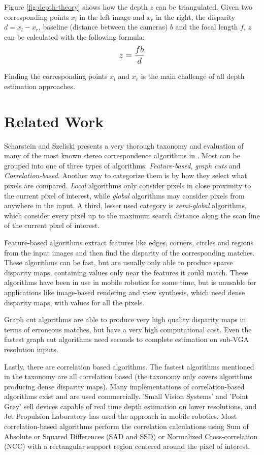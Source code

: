 Figure \ref{fig:depth-theory} shows how the depth $z$ can be
triangulated. Given two corresponding points $x_l$ in the left image
and $x_r$ in the right, the disparity $d = x_l - x_r$, baseline
(distance between the cameras) $b$ and the focal length $f$, $z$ can
be calculated with the following formula:
\[
  \mathlarger{z = \frac{fb}{d}}
\]

Finding the corresponding points $x_{l}$ and $x_{r}$ is the main
challenge of all depth estimation approaches.


\section{Related Work}

Scharstein and Szeliski presents a very thorough taxonomy and
evaluation of many of the most known stereo correspondence algorithms
in \cite{taxonomy}. Most can be grouped into one of three types of
algorithms: \textit{Feature-based}, \textit{graph cuts} and
\textit{Correlation-based}. Another way to categorize them is by how
they select what pixels are compared. \textit{Local} algorithms only
consider pixels in close proximity to the current pixel of interest,
while \textit{global} algorithms may consider pixels from anywhere in
the input. A third, lesser used category is \textit{semi-global}
algorithms, which consider every pixel up to the maximum search
distance along the scan line of the current pixel of interest.

Feature-based algorithms\cite{hannah74, marr-poggio79, nishimoto88}
extract features like edges, corners, circles and regions from the
input images and then find the disparity of the corresponding matches.
These algorithms can be fast, but are usually only able to produce
sparse disparity maps, containing values only near the features it
could match. These algorithms have been in use in mobile robotics for
some time\cite{feature-based-robotics}, but is unusable for
applications like image-based rendering and view synthesis, which need
dense disparity maps, with values for all the pixels.

Graph cut algorithms\cite{markov98,boykov99,boykov04} are able to
produce very high quality disparity maps in terms of erroneous
matches, but have a very high computational cost. Even the fastest
graph cut algorithms need seconds to complete estimation on sub-VGA
resolution inputs.

Lastly, there are correlation based algorithms. The fastest algorithms
mentioned in the taxonomy are all correlation based (the taxonomy only
covers algorithms producing dense disparity maps). Many
implementations of correlation-based algorithms exist and are used
commercially. 'Small Vision Systems'\cite{svs98} and 'Point
Grey'\cite{pg} sell devices capable of real time depth estimation on
lower resolutions, and Jet Propulsion Laboratory\cite{jpl1, jpl2} has
used the approach in mobile robotics. Most correlation-based
algorithms perform the correlation calculations using Sum of Absolute
or Squared Differences (SAD and SSD)\cite{faugeras93} or Normalized
Cross-correlation (NCC)\cite{ncc93} with a rectangular support region
centered around the pixel of interest.

